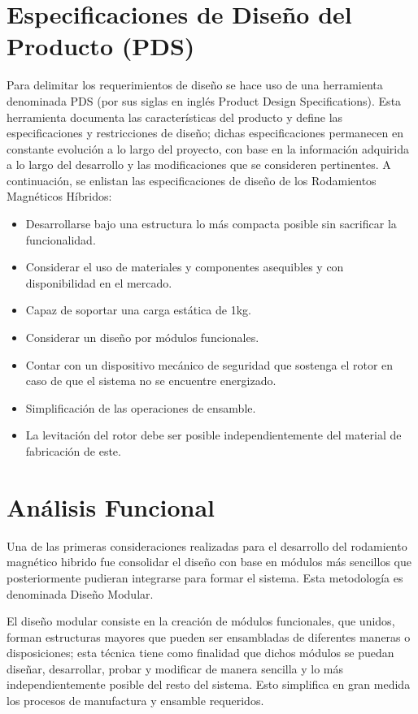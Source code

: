 \section{Especificaciones de Diseño del Producto (PDS)}
\label{sec:system:sec2}

Para delimitar los requerimientos de diseño se hace uso de una herramienta denominada PDS (por sus siglas en inglés Product Design Specifications). Esta herramienta documenta las características del producto y define las especificaciones y restricciones de diseño; dichas especificaciones permanecen en constante evolución a lo largo del proyecto, con base en la información adquirida a lo largo del desarrollo y las modificaciones que se consideren pertinentes.  
A continuación, se enlistan las especificaciones de diseño de los Rodamientos Magnéticos Híbridos:

\begin{itemize}
\addtolength{\itemsep}{-1mm}
\item Desarrollarse bajo una estructura lo más compacta posible sin sacrificar la funcionalidad.
\item Considerar el uso de materiales y componentes asequibles y con disponibilidad en el mercado. 
\item Capaz de soportar una carga estática de 1kg.
\item Considerar un diseño por módulos funcionales. 
\item Contar con un dispositivo mecánico de seguridad que sostenga el rotor en caso de que el sistema no se encuentre energizado.
\item Simplificación de las operaciones de ensamble. 
\item La levitación del rotor debe ser posible independientemente del material de fabricación de este. 
\end{itemize}



\section{Análisis Funcional}
\label{sec:system:sec3}

Una de las primeras consideraciones realizadas para el desarrollo del rodamiento magnético hibrido fue consolidar el diseño con base en módulos más sencillos que posteriormente pudieran integrarse para formar el sistema. Esta metodología es denominada Diseño Modular.
 
El diseño modular consiste en la creación de módulos funcionales, que unidos, forman estructuras mayores que pueden ser ensambladas de diferentes maneras o disposiciones; esta técnica tiene como finalidad que dichos módulos se puedan diseñar, desarrollar, probar y modificar de manera sencilla y lo más independientemente posible del resto del sistema. Esto simplifica en gran medida los procesos de manufactura y ensamble requeridos. 

